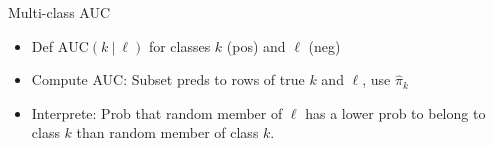 

\begin{vbframe}{Multi-class AUC}

\begin{itemize}

\item Def $\text{AUC}(k ~|~ \ell)$ for classes $k$ (pos) and $\ell$ (neg)

\item Compute AUC: Subset preds to rows of true $k$ and $\ell$, use $\hat \pi_k$ 

\item Interprete: Prob that random member of $\ell$ has a lower prob to belong to class $k$ than random member of class $k$.

\end{itemize}

\lz


\end{vbframe}
